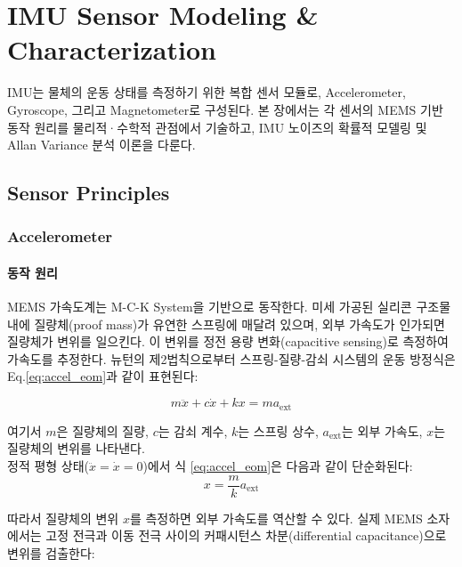 \section{IMU Sensor Modeling \& Characterization}
    IMU는 물체의 운동 상태를 측정하기 위한 복합 센서 모듈로, Accelerometer, Gyroscope, 그리고 Magnetometer로 구성된다. 본 장에서는 각 센서의 MEMS 기반 동작 원리를 물리적·수학적 관점에서 기술하고, IMU 노이즈의 확률적 모델링 및 Allan Variance 분석 이론을 다룬다.\\

    \subsection{Sensor Principles}
        \subsubsection{Accelerometer}
            \paragraph{동작 원리}
                MEMS 가속도계는 M-C-K System을 기반으로 동작한다. 미세 가공된 실리콘 구조물 내에 질량체(proof mass)가 유연한 스프링에 매달려 있으며, 외부 가속도가 인가되면 질량체가 변위를 일으킨다. 이 변위를 정전 용량 변화(capacitive sensing)로 측정하여 가속도를 추정한다. 뉴턴의 제2법칙으로부터 스프링-질량-감쇠 시스템의 운동 방정식은 Eq.\ref{eq:accel_eom}과 같이 표현된다:

                \begin{equation}
                    m\ddot{x} + c\dot{x} + kx = m a_{\text{ext}}
                    \label{eq:accel_eom}
                \end{equation}

                \noindent 여기서 $m$은 질량체의 질량, $c$는 감쇠 계수, $k$는 스프링 상수, $a_{\text{ext}}$는 외부 가속도, $x$는 질량체의 변위를 나타낸다.\\

                정적 평형 상태($\ddot{x} = \dot{x} = 0$)에서 식 \eqref{eq:accel_eom}은 다음과 같이 단순화된다:\\

                \begin{equation}
                    x = \frac{m}{k} a_{\text{ext}}
                    \label{eq:accel_static}
                \end{equation}

                따라서 질량체의 변위 $x$를 측정하면 외부 가속도를 역산할 수 있다. 실제 MEMS 소자에서는 고정 전극과 이동 전극 사이의 커패시턴스 차분(differential capacitance)으로 변위를 검출한다:\\

